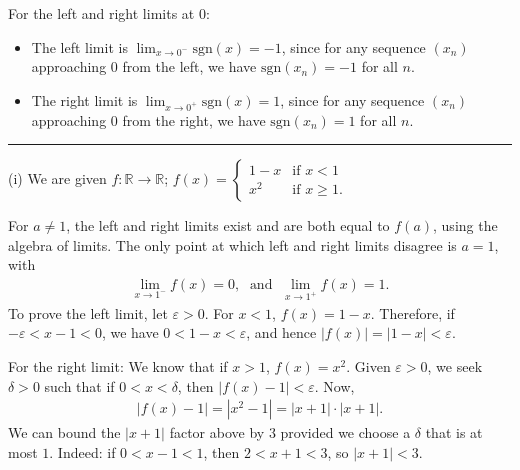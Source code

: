 \documentclass[letterpaper,10pt,english]{jupyterBook}
\begin{document}
\sphinxAtStartPar
For the left and right limits at \(0\):
\begin{itemize}
\item {} 
\sphinxAtStartPar
The left limit is \(\displaystyle\lim_{x \rightarrow 0^-} \text{sgn}(x) = -1\), since for any sequence \((x_n)\) approaching \(0\) from the left, we have \(\text{sgn}(x_n) = -1\) for all \(n\).

\item {} 
\sphinxAtStartPar
The right limit is \(\displaystyle\lim_{x \rightarrow 0^+} \text{sgn}(x) = 1\),  since for any sequence \((x_n)\) approaching \(0\) from the right, we have \(\text{sgn}(x_n) = 1\) for all \(n\).

\end{itemize}


\bigskip\hrule\bigskip

\label{\detokenize{Solutions-upto46:id3}}
\sphinxAtStartPar
{\hyperref[\detokenize{Problems:id8}]{}} 

\sphinxAtStartPar
(i) We are given \(f:\mathbb{R}\to\mathbb{R}\); \(f(x) = \begin{cases} 1 -x & \text{if }x < 1\\ x^{2}& \text{if }x \geq 1. \end{cases}\)

\sphinxAtStartPar
For \(a\neq 1\), the left and right limits exist and are both equal to \(f(a)\), using the algebra of limits. The only point at which left and right limits disagree is \(a = 1\), with
\begin{equation*}
\begin{split}
\lim_{x \rightarrow 1^-}f(x) = 0, \; \text{ and } \; \lim_{x \rightarrow 1^+}f(x) = 1.
\end{split}
\end{equation*}
\sphinxAtStartPar
To prove the left limit, let \(\varepsilon>0\). For \(x<1\), \(f(x)=1-x\). Therefore, if \(-\varepsilon<x-1<0\), we have \(0<1-x<\varepsilon\), and hence \(|f(x)|=|1-x|<\varepsilon\).

\sphinxAtStartPar
For the right limit: We know that if \(x>1\), \(f(x)=x^2\). Given \(\varepsilon>0\), we seek \(\delta>0\) such that if \(0<x<\delta\), then \(|f(x)-1|<\varepsilon\). Now,
\begin{equation*}
\begin{split}
|f(x)-1|=|x^2-1|=|x+1|\cdot|x+1|.
\end{split}
\end{equation*}
\sphinxAtStartPar
We can bound the \(|x+1|\) factor above by \(3\) provided we choose a \(\delta\) that is at most \(1\). Indeed: if \(0<x-1<1\), then \(2<x+1<3\), so \(|x+1|<3\).
\end{document}
